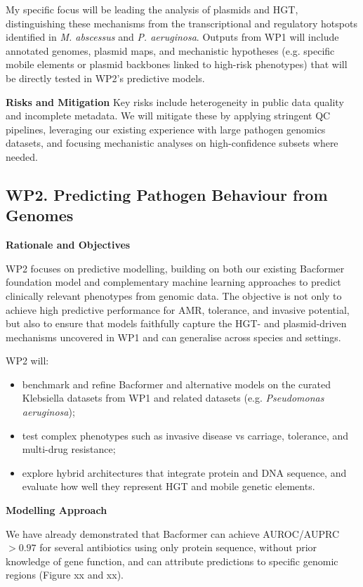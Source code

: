 My specific focus will be leading the analysis of plasmids and HGT, distinguishing these mechanisms from the transcriptional and regulatory hotspots identified in \textit{M. abscessus} and \textit{P. aeruginosa}. Outputs from WP1 will include annotated genomes, plasmid maps, and mechanistic hypotheses (e.g. specific mobile elements or plasmid backbones linked to high-risk phenotypes) that will be directly tested in WP2's predictive models.

\textbf{Risks and Mitigation}
Key risks include heterogeneity in public data quality and incomplete metadata. We will mitigate these by applying stringent QC pipelines, leveraging our existing experience with large pathogen genomics datasets, and focusing mechanistic analyses on high-confidence subsets where needed.

\subsection*{WP2. Predicting Pathogen Behaviour from Genomes}

\textbf{Rationale and Objectives}

WP2 focuses on predictive modelling, building on both our existing Bacformer foundation model 
and complementary machine learning approaches to predict clinically relevant phenotypes from genomic data. 
The objective is not only to achieve high predictive performance for AMR, tolerance, and invasive potential, 
but also to ensure that models faithfully capture the HGT- and plasmid-driven mechanisms uncovered in WP1 and 
can generalise across species and settings.

WP2 will:

\begin{itemize}
  \item benchmark and refine Bacformer and alternative models on the curated Klebsiella datasets 
  from WP1 and related datasets (e.g. \textit{Pseudomonas aeruginosa});
  \item test complex phenotypes such as invasive disease vs carriage, tolerance, and multi-drug resistance;
  \item explore hybrid architectures that integrate protein and DNA sequence, 
  and evaluate how well they represent HGT and mobile genetic elements.
\end{itemize}

\textbf{Modelling Approach}

We have already demonstrated that Bacformer can achieve AUROC/AUPRC $>0.97$ 
for several antibiotics using only protein sequence, without prior knowledge of gene function, 
and can attribute predictions to specific genomic regions (Figure xx and xx). 

